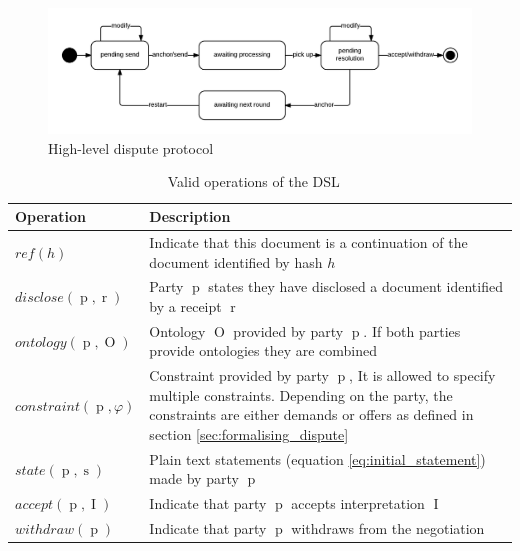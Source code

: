 \documentclass[12pt,msc,a4paper,oneside]{ucl_thesis}
\DeclareMathOperator{\receipt}{r}
\DeclareMathOperator{\Metalang}{\mathcal{L}_m}
\DeclareMathOperator{\Interpretation}{I}
\DeclareMathOperator{\Ontology}{O}
\DeclareMathOperator{\statement}{s}
\DeclareMathOperator{\party}{p}
\begin{document}
\begin{figure}
    \includegraphics[width=\textwidth]{./figures/adr_dispute.png}
    \caption{High-level dispute protocol}
    \label{fig:adr_dispute}
\end{figure}

\begin{table}
    \centering
    \begin{tabularx}{\textwidth}{|l X|}
        \hline
        \textbf{Operation} & \textbf{Description} \\
        \hline
        $ref(h)$ & Indicate that this document is a continuation of the document identified by hash $h$ \\
        $disclose(\party, \receipt)$ & Party $\party$ states they have disclosed a document identified by a receipt $\receipt$ \\
        $ontology(\party, \Ontology)$ & Ontology $\Ontology$ provided by party $\party$. If both parties provide ontologies they are combined \\
        $constraint(\party, \varphi)$ & Constraint provided by party $\party$, It is allowed to specify multiple constraints. Depending on the party, the constraints are either demands or offers as defined in section \ref{sec:formalising_dispute} \\
        $state(\party, \statement)$ & Plain text statements (equation \ref{eq:initial_statement}) made by party $\party$ \\
        $accept(\party, \Interpretation)$ & Indicate that party $\party$ accepts interpretation $\Interpretation$ \\
        $withdraw(\party)$ & Indicate that party $\party$ withdraws from the negotiation \\
        \hline
    \end{tabularx}
    \label{tab:dsl_operations}
    \caption{Valid operations of the DSL $\Metalang$}
\end{table}
\end{document}
